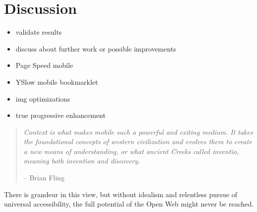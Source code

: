 \chapter{Discussion}
\label{chapter:discussion}


\begin{itemize}
\item validate results
\item discuss about further work or possible improvements
\item Page Speed mobile
\item YSlow mobile bookmarklet
\item img optimizations
\item true progressive enhancement
\end{itemize}

\begin{quotation}
  \noindent \textit{Context  is what makes mobile such  a powerful and
    exiting  medium. It  takes  the foundational  concepts of  western
    civilization  and   evolves  them  to   create  a  new   means  of
    understanding,  or what  ancient Creeks  called  inventio, meaning
    both invention and discovery.}
  \begin{flushright}
    -- Brian Fling \cite{fling2009mobile}
  \end{flushright}
\end{quotation}

There is grandeur in this view, but without idealism and relentless
pursue of universal accessibility, the full potential of the Open Web
might never be reached.
